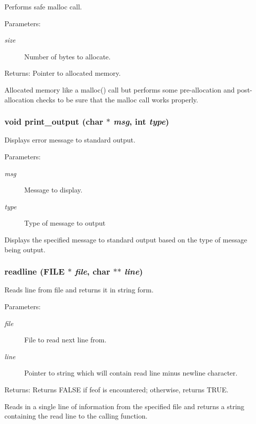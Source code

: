Performs safe malloc call.

\begin{Desc}
\item[Parameters:]
\begin{description}
\item[{\em size}]Number of bytes to allocate.\end{description}
\end{Desc}
\begin{Desc}
\item[Returns:]Pointer to allocated memory.\end{Desc}
Allocated memory like a malloc() call but performs some pre-allocation and post-allocation checks to be sure that the malloc call works properly. 
\subsubsection{\setlength{\rightskip}{0pt plus 5cm}void print\_\-output (char $\ast$ {\em msg}, int {\em type})}\label{util_8h_a2}


Displays error message to standard output.

\begin{Desc}
\item[Parameters:]
\begin{description}
\item[{\em msg}]Message to display. \item[{\em type}]Type of message to output\end{description}
\end{Desc}
Displays the specified message to standard output based on the type of message being output. 
\subsubsection{ readline (FILE $\ast$ {\em file}, char $\ast$$\ast$ {\em line})}\label{util_8h_a8}


Reads line from file and returns it in string form.

\begin{Desc}
\item[Parameters:]
\begin{description}
\item[{\em file}]File to read next line from. \item[{\em line}]Pointer to string which will contain read line minus newline character.\end{description}
\end{Desc}
\begin{Desc}
\item[Returns:]Returns FALSE if feof is encountered; otherwise, returns TRUE.\end{Desc}
Reads in a single line of information from the specified file and returns a string containing the read line to the calling function. 
